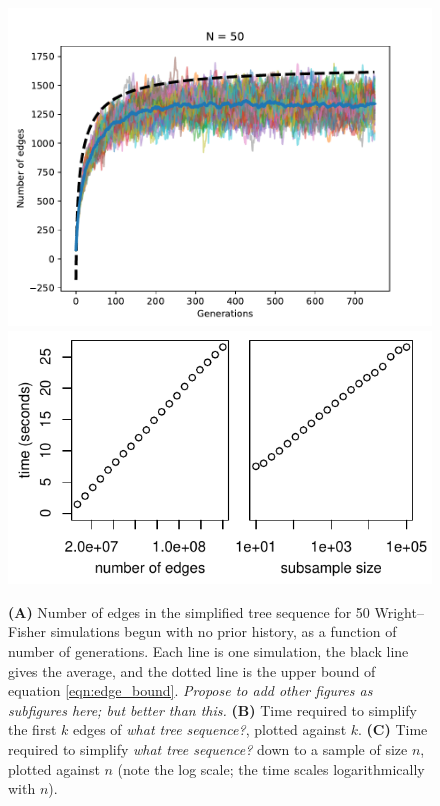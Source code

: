 \documentclass{article}
\newcommand{\plr}[1]{{\em \color{blue} #1}}
\begin{document}
\begin{figure}
    \begin{center}
        \includegraphics{sims/num_edges_50}
        \includegraphics{sims/simplify_timings}
    \end{center}
    \caption{
        \textbf{(A)}
        Number of edges in the simplified tree sequence
        for 50 Wright--Fisher simulations begun with no prior history,
        as a function of number of generations.
        Each line is one simulation, the black line gives the average,
        and the dotted line is the upper bound of equation \eqref{eqn:edge_bound}.
        \plr{Propose to add other figures as subfigures here; but better than this.}
        \textbf{(B)}
        Time required to simplify the first $k$ edges
        of \plr{what tree sequence?},
        plotted against $k$.
        \textbf{(C)}
        Time required to simplify
        \plr{what tree sequence?}
        down to a sample of size $n$,
        plotted against $n$
        (note the log scale;
        the time scales logarithmically with $n$).
        \label{fig:simplify_complexity}
    }
\end{figure}
\end{document}
